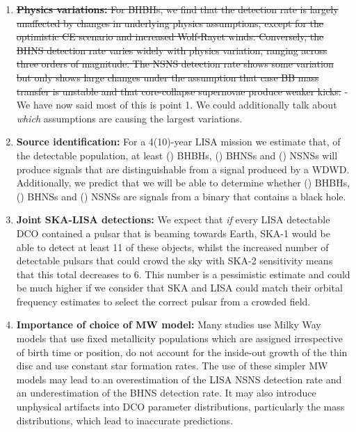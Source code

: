 \begin{enumerate}
    \item \sout{\textbf{Physics variations:} For BHBHs, we find that the detection rate is largely unaffected by changes in underlying physics assumptions, except for the optimistic CE scenario and increased Wolf-Rayet winds. Conversely, the BHNS detection rate varies widely with physics variation, ranging across three orders of magnitude. The NSNS detection rate shows some variation but only shows large changes under the assumption that case BB mass transfer is unstable and that core-collapse supernovae produce weaker kicks.} - We have now said most of this is point 1. We could additionally talk about \textit{which} assumptions are causing the largest variations.
    \item \textbf{Source identification:} For a 4(10)-year LISA mission we estimate that, of the detectable population, at least \BHBHNotWDWDFour{}(\BHBHNotWDWDTen{}) BHBHs, \BHNSNotWDWDFour{}(\BHNSNotWDWDTen{}) BHNSs and \NSNSNotWDWDFour{}(\NSNSNotWDWDTen{}) NSNSs will produce signals that are distinguishable from a signal produced by a WDWD. Additionally, we predict that we will be able to determine whether \BHBHEitherBHOrNSFour{}(\BHBHEitherBHOrNSTen{}) BHBHs, \BHNSEitherBHOrNSFour{}(\BHNSEitherBHOrNSTen{}) BHNSs and \NSNSEitherBHOrNSFour{}(\NSNSEitherBHOrNSTen{}) NSNSs are signals from a binary that contains a black hole.
    \item \textbf{Joint SKA-LISA detections:} We expect that \textit{if} every LISA detectable DCO contained a pulsar that is beaming towards Earth, SKA-1 would be able to detect at least 11 of these objects, whilst the increased number of detectable pulsars that could crowd the sky with SKA-2 sensitivity means that this total decreases to 6. This number is a pessimistic estimate and could be much higher if we consider that SKA and LISA could match their orbital frequency estimates to select the correct pulsar from a crowded field.
    \item \textbf{Importance of choice of MW model:} Many studies use Milky Way models that use fixed metallicity populations which are assigned irrespective of birth time or position, do not account for the inside-out growth of the thin disc and use constant star formation rates. The use of these simpler MW models may lead to an overestimation of the LISA NSNS detection rate and an underestimation of the BHNS detection rate. It may also introduce unphysical artifacts into DCO parameter distributions, particularly the mass distributions, which lead to inaccurate predictions.
\end{enumerate}